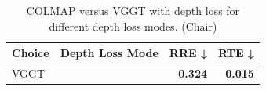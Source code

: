 \begin{table}[H]
\caption{COLMAP versus VGGT with depth loss for different depth loss modes. (Chair)}
\label{tab:05_depth_loss_mode_chair}
\begin{tabular}{llrr}
\toprule
Choice & Depth Loss Mode & RRE ↓ & RTE ↓ \\
\midrule
VGGT &  & \textbf{0.324} & \textbf{0.015} \\
\bottomrule
\end{tabular}
\end{table}
